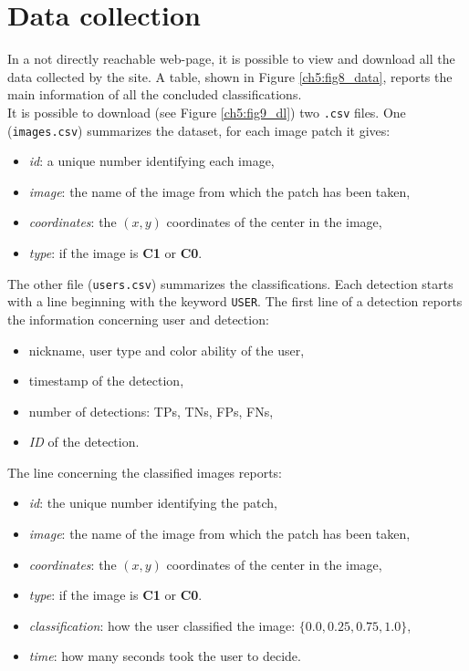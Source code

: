 \vspace{0.5cm}


\section{Data collection}

In a not directly reachable web-page, it is possible to view and download all the data collected by the site. A table, shown in Figure \ref{ch5:fig8_data},
reports the main information of all the concluded classifications.\\
It is possible to download (see Figure \ref{ch5:fig9_dl}) two \texttt{.csv} files. One (\texttt{images.csv}) summarizes the dataset, for each image patch it gives:
\begin{itemize}
 \item \textit{id}: a unique number identifying each image,
 \item \textit{image}: the name of the image from which the patch has been taken,
 \item \textit{coordinates}: the $(x,y)$ coordinates of the center in the image,
 \item \textit{type}: if the image is \textbf{C1} or \textbf{C0}.
\end{itemize}

\noindent The other file (\texttt{users.csv}) summarizes the classifications. Each detection starts with a line beginning with the keyword \texttt{USER}.
The first line of a detection reports the information concerning user and detection:

\begin{itemize}
 \item nickname, user type and color ability of the user,
 \item timestamp of the detection,
 \item number of detections: \Glspl{TP}, \Glspl{TN}, \Glspl{FP}, \Glspl{FN},
 \item \textit{ID} of the detection.
\end{itemize}

\noindent The line concerning the classified images reports:

\begin{itemize}
 \item \textit{id}: the unique number identifying the patch,
 \item \textit{image}: the name of the image from which the patch has been taken,
 \item \textit{coordinates}: the $(x,y)$ coordinates of the center in the image,
 \item \textit{type}: if the image is \textbf{C1} or \textbf{C0}.
 \item \textit{classification}: how the user classified the image: $\{0.0, 0.25, 0.75, 1.0\}$,
 \item \textit{time}: how many seconds took the user to decide.
\end{itemize}

